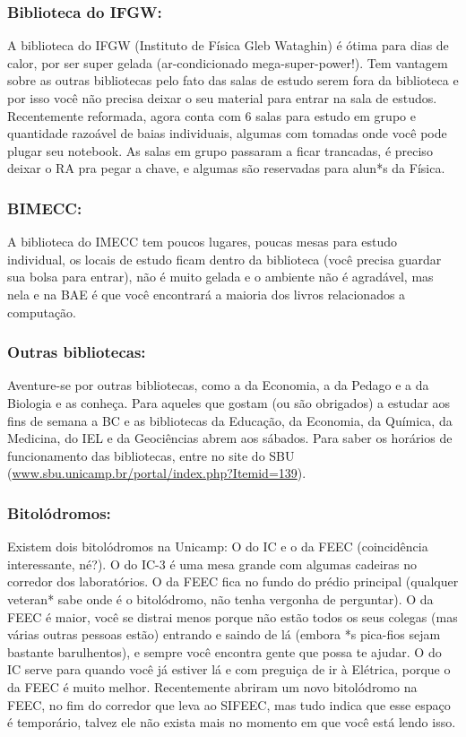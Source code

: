 \subsubsection{Biblioteca do IFGW:} A biblioteca do IFGW (Instituto de Física
Gleb Wataghin) é ótima para dias de calor, por ser super gelada (ar-condicionado
mega-super-power!). Tem vantagem sobre as outras bibliotecas pelo fato das salas
de estudo serem fora da biblioteca e por isso você não precisa deixar o seu
material para entrar na sala de estudos. Recentemente reformada, agora conta com
6 salas para estudo em grupo e quantidade razoável de baias individuais, algumas
com tomadas onde você pode plugar seu notebook. As salas em grupo passaram a
ficar trancadas, é preciso deixar o RA pra pegar a chave, e algumas são
reservadas para alun*s da Física.

\subsubsection{BIMECC:} A biblioteca do IMECC tem poucos lugares, poucas mesas
para estudo individual, os locais de estudo ficam dentro da biblioteca (você
precisa guardar sua bolsa para entrar), não é muito gelada e o ambiente não é
agradável, mas nela e na BAE é que você encontrará a maioria dos livros
relacionados a computação.

\subsubsection{Outras bibliotecas:} Aventure-se por outras bibliotecas, como a
da Economia, a da Pedago e a da Biologia e as conheça. Para aqueles que gostam
(ou são obrigados) a estudar aos fins de semana a BC e as bibliotecas da
Educação, da Economia, da Química, da Medicina, do IEL e da Geociências abrem
aos sábados. Para saber os horários de funcionamento das bibliotecas, entre no
site do SBU (\url{www.sbu.unicamp.br/portal/index.php?Itemid=139}).

\subsubsection{Bitolódromos:} Existem dois bitolódromos na Unicamp: O do IC e o
da FEEC (coincidência interessante, né?). O do IC-3 é uma mesa grande com
algumas cadeiras no corredor dos laboratórios. O da FEEC fica no fundo do prédio
principal (qualquer veteran* sabe onde é o bitolódromo, não tenha vergonha de
perguntar). O da FEEC é maior, você se distrai menos porque não estão todos os
seus colegas (mas várias outras pessoas estão) entrando e saindo de lá (embora
*s pica-fios sejam bastante barulhentos), e sempre você encontra gente que possa
te ajudar.  O do IC serve para quando você já estiver lá e com preguiça de ir à
Elétrica, porque o da FEEC é muito melhor. Recentemente abriram um novo
bitolódromo na FEEC, no fim do corredor que leva ao SIFEEC, mas tudo indica que
esse espaço é temporário, talvez ele não exista mais no momento em que você está
lendo isso.


